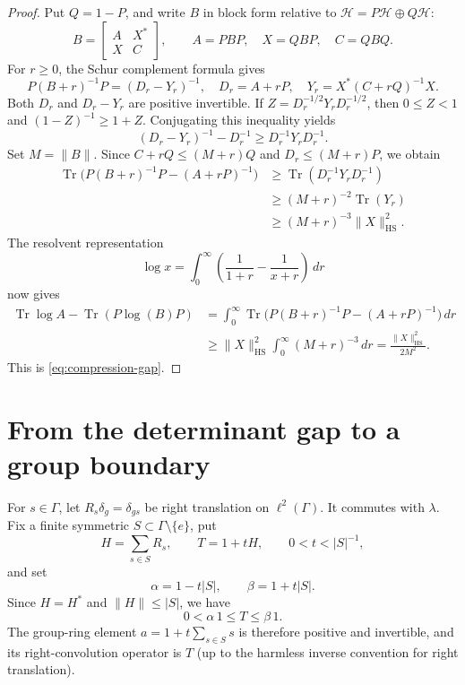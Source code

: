 \documentclass[11pt]{article}
\newcommand{\G}{\Gamma}
\newcommand{\Tr}{\operatorname{Tr}}
\newcommand{\HS}{\mathrm{HS}}
\begin{document}
\begin{proof}
Put $Q=1-P$, and write $B$ in block form relative to
$\mathcal H=P\mathcal H\oplus Q\mathcal H$:
\[
 B=\begin{bmatrix}A&X^*\\X&C\end{bmatrix},
 \qquad A=PBP,\quad X=QBP,\quad C=QBQ.
\]
For $r\geq0$, the Schur complement formula gives
\[
 P(B+r)^{-1}P=(D_r-Y_r)^{-1},
 \quad D_r=A+rP,
 \quad Y_r=X^*(C+rQ)^{-1}X.
\]
Both $D_r$ and $D_r-Y_r$ are positive invertible.  If
$Z=D_r^{-1/2}Y_rD_r^{-1/2}$, then $0\leq Z<1$ and
$(1-Z)^{-1}\geq1+Z$.  Conjugating this inequality yields
\[
 (D_r-Y_r)^{-1}-D_r^{-1}\geq D_r^{-1}Y_rD_r^{-1}.
\]
Set $M=\|B\|$.  Since $C+rQ\leq(M+r)Q$ and
$D_r\leq(M+r)P$, we obtain
\begin{align*}
 \Tr\bigl(P(B+r)^{-1}P-(A+rP)^{-1}\bigr)
 &\geq \Tr(D_r^{-1}Y_rD_r^{-1})\\
 &\geq (M+r)^{-2}\Tr(Y_r)\\
 &\geq (M+r)^{-3}\|X\|_{\HS}^2.
\end{align*}
The resolvent representation
\[
 \log x=\int_0^\infty\left(\frac1{1+r}-\frac1{x+r}\right)\,dr
\]
now gives
\begin{align*}
 \Tr\log A-\Tr(P\log(B)P)
 &=\int_0^\infty
   \Tr\bigl(P(B+r)^{-1}P-(A+rP)^{-1}\bigr)\,dr\\
 &\geq \|X\|_{\HS}^2\int_0^\infty(M+r)^{-3}\,dr
 =\frac{\|X\|_{\HS}^2}{2M^2}.
\end{align*}
This is \eqref{eq:compression-gap}.
\end{proof}

\section{From the determinant gap to a group boundary}

For $s\in\G$, let $R_s\delta_g=\delta_{gs}$ be right translation on
$\ell^2(\G)$.  It commutes with $\lambda$.  Fix a finite symmetric
$S\subset\G\setminus\{e\}$, put
\[
 H=\sum_{s\in S}R_s,
 \qquad T=1+tH,
 \qquad 0<t<|S|^{-1},
\]
and set
\[
 \alpha=1-t|S|,
 \qquad \beta=1+t|S|.
\]
Since $H=H^*$ and $\|H\|\leq|S|$, we have
\begin{equation}\label{eq:T-bounds}
 0<\alpha\,1\leq T\leq\beta\,1.
\end{equation}
The group-ring element $a=1+t\sum_{s\in S}s$ is therefore positive and
invertible, and its right-convolution operator is $T$ (up to the harmless
inverse convention for right translation).
\end{document}
